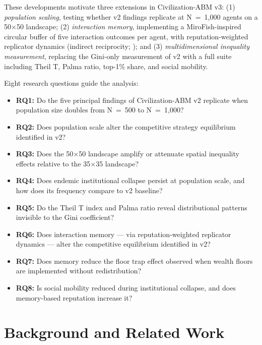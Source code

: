 \documentclass[12pt, letterpaper]{article}
\begin{document}
These developments motivate three extensions in Civilization-ABM v3:
(1) \emph{population scaling}, testing whether v2 findings replicate at
N~=~1,000 agents on a 50$\times$50 landscape; (2) \emph{interaction
memory}, implementing a MiroFish-inspired circular buffer of five
interaction outcomes per agent, with reputation-weighted replicator
dynamics (indirect reciprocity; \citealp{nowak1998indirect,
santos2008social}); and (3) \emph{multidimensional inequality
measurement}, replacing the Gini-only measurement of v2 with a full
suite including Theil T, Palma ratio, top-1\% share, and social
mobility.

Eight research questions guide the analysis:

\begin{itemize}
  \item \textbf{RQ1:} Do the five principal findings of Civilization-ABM
    v2 replicate when population size doubles from N~=~500 to
    N~=~1,000?
  \item \textbf{RQ2:} Does population scale alter the competitive
    strategy equilibrium identified in v2?
  \item \textbf{RQ3:} Does the 50$\times$50 landscape amplify or
    attenuate spatial inequality effects relative to the 35$\times$35
    landscape?
  \item \textbf{RQ4:} Does endemic institutional collapse persist at
    population scale, and how does its frequency compare to v2
    baseline?
  \item \textbf{RQ5:} Do the Theil T index and Palma ratio reveal
    distributional patterns invisible to the Gini coefficient?
  \item \textbf{RQ6:} Does interaction memory --- via reputation-weighted
    replicator dynamics --- alter the competitive equilibrium identified
    in v2?
  \item \textbf{RQ7:} Does memory reduce the floor trap effect observed
    when wealth floors are implemented without redistribution?
  \item \textbf{RQ8:} Is social mobility reduced during institutional
    collapse, and does memory-based reputation increase it?
\end{itemize}


\section{Background and Related Work}
\end{document}
